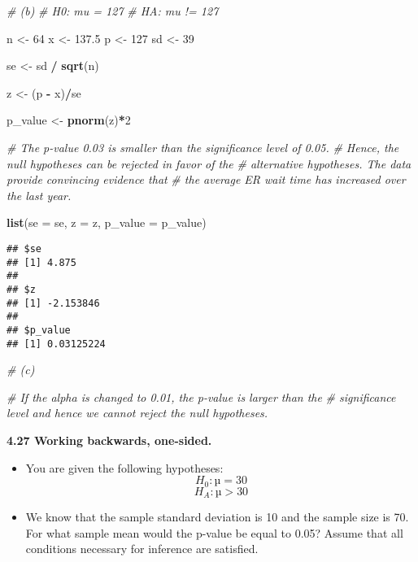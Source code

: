 \documentclass[]{book}
\newenvironment{Shaded}{\begin{snugshade}}{\end{snugshade}}
\newcommand{\CommentTok}[1]{\textcolor[rgb]{0.56,0.35,0.01}{\textit{#1}}}
\newcommand{\DataTypeTok}[1]{\textcolor[rgb]{0.13,0.29,0.53}{#1}}
\newcommand{\DecValTok}[1]{\textcolor[rgb]{0.00,0.00,0.81}{#1}}
\newcommand{\FloatTok}[1]{\textcolor[rgb]{0.00,0.00,0.81}{#1}}
\newcommand{\KeywordTok}[1]{\textcolor[rgb]{0.13,0.29,0.53}{\textbf{#1}}}
\newcommand{\NormalTok}[1]{#1}
\newcommand{\OperatorTok}[1]{\textcolor[rgb]{0.81,0.36,0.00}{\textbf{#1}}}
\newcommand{\StringTok}[1]{\textcolor[rgb]{0.31,0.60,0.02}{#1}}
\providecommand{\tightlist}{%
  \setlength{\itemsep}{0pt}\setlength{\parskip}{0pt}}
\begin{document}
\begin{Shaded}
\begin{Highlighting}[]
\CommentTok{# (b)}
\CommentTok{# H0: mu = 127}
\CommentTok{# HA: mu != 127}

\NormalTok{n <-}\StringTok{ }\DecValTok{64}
\NormalTok{x <-}\StringTok{ }\FloatTok{137.5}
\NormalTok{p <-}\StringTok{ }\DecValTok{127}
\NormalTok{sd <-}\StringTok{ }\DecValTok{39}

\NormalTok{se <-}\StringTok{ }\NormalTok{sd }\OperatorTok{/}\StringTok{ }\KeywordTok{sqrt}\NormalTok{(n)}

\NormalTok{z <-}\StringTok{ }\NormalTok{(p }\OperatorTok{-}\StringTok{ }\NormalTok{x)}\OperatorTok{/}\NormalTok{se}

\NormalTok{p_value <-}\StringTok{ }\KeywordTok{pnorm}\NormalTok{(z)}\OperatorTok{*}\DecValTok{2}

\CommentTok{# The p-value 0.03 is smaller than the significance level of 0.05.}
\CommentTok{# Hence, the null hypotheses can be rejected in favor of the}
\CommentTok{# alternative hypotheses. The data provide convincing evidence that}
\CommentTok{# the average ER wait time has increased over the last year.}

\KeywordTok{list}\NormalTok{(}\DataTypeTok{se =}\NormalTok{ se, }\DataTypeTok{z =}\NormalTok{ z, }\DataTypeTok{p_value =}\NormalTok{ p_value)}
\end{Highlighting}
\end{Shaded}

\begin{verbatim}
## $se
## [1] 4.875
## 
## $z
## [1] -2.153846
## 
## $p_value
## [1] 0.03125224
\end{verbatim}

\begin{Shaded}
\begin{Highlighting}[]
\CommentTok{# (c)}

\CommentTok{# If the alpha is changed to 0.01, the p-value is larger than the }
\CommentTok{# significance level and hence we cannot reject the null hypotheses.}
\end{Highlighting}
\end{Shaded}

\textbf{4.27 Working backwards, one-sided.}

\begin{itemize}
\tightlist
\item
  You are given the following hypotheses:
  \[H_0 : µ = 30\]
  \[H_A : µ > 30\]
\item
  We know that the sample standard deviation is 10 and the sample size is 70. For what sample
  mean would the p-value be equal to 0.05? Assume that all conditions necessary for inference are
  satisfied.
\end{itemize}
\end{document}
